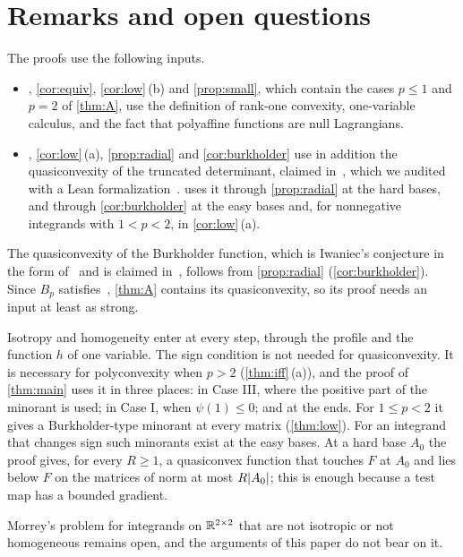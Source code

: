 \section{Remarks and open questions}\label{sec:discussion}

\begin{remark}
The proofs use the following inputs.
\begin{itemize}
\item {}, \cref{cor:equiv}, \cref{cor:low}\,(b) and
  \cref{prop:small}, which contain the cases $p\le1$ and $p=2$ of \cref{thm:A}, use the
  definition of rank-one convexity, one-variable calculus, and the fact that polyaffine
  functions are null Lagrangians.
\item {}, \cref{cor:low}\,(a), \cref{prop:radial} and \cref{cor:burkholder} use in
  addition the quasiconvexity of the truncated determinant, claimed
  in~\cite[Theorem~1]{SharpHI}, which we audited with a Lean formalization~\cite{IwaniecLean}.
   uses it through \cref{prop:radial} at the hard bases, and through
  \cref{cor:burkholder} at the easy bases and, for nonnegative integrands with $1<p<2$, in
  \cref{cor:low}\,(a).
\end{itemize}
The quasiconvexity of the Burkholder function, which is Iwaniec's conjecture in the form
of~\cite[Conjecture~1.1]{GuerraKristensen2022} and is claimed in~\cite[Corollary~2]{SharpHI},
follows from \cref{prop:radial} (\cref{cor:burkholder}). Since $B_p$ satisfies~\Hyp,
\cref{thm:A} contains its quasiconvexity, so its proof needs an input at least as strong.
\end{remark}

\begin{remark}
Isotropy and homogeneity enter at every step, through the profile and the function $h$ of one
variable. The sign condition is not needed for quasiconvexity. It is necessary for
polyconvexity when $p>2$ (\cref{thm:iff}\,(a)), and the proof of \cref{thm:main} uses it in
three places: in Case III, where the positive part of the minorant is used; in Case I, when
$\psi(1)\le0$; and at the ends. For $1\le p<2$ it gives a Burkholder-type minorant at every
matrix (\cref{thm:low}). For an integrand that changes sign such minorants exist at the easy
bases. At a hard base $A_0$ the proof gives, for every $R\ge1$, a quasiconvex function that
touches $F$ at $A_0$ and lies below $F$ on the matrices of norm at most $R\lvert A_0\rvert$; this is
enough because a test map has a bounded gradient.
\end{remark}

\begin{remark}
Morrey's problem for integrands on $\mathbb{R}^{2\times 2}$ that are not isotropic or not homogeneous remains open,
and the arguments of this paper do not bear on it.
\end{remark}
